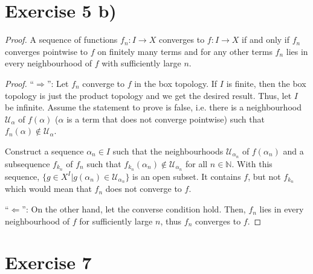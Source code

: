 \documentclass[a4paper]{article}
\theoremstyle{definition}
\begin{document}
\section*{Exercise 5 b)}
    \begin{proof}
        A sequence of functions \(f_n: I \longrightarrow X\) converges to \(f: I \longrightarrow X\) if and only if \(f_n\) converges pointwise to \(f\) on finitely many terms and for any other terms \(f_n\) lies in every neighbourhood of \(f\) with sufficiently large \(n\).
        
        \textit{Proof.} ``\(\Rightarrow\)'': Let \(f_n\) converge to \(f\) in the box topology. If \(I\) is finite, then the box topology is just the product topology and we get the desired result. Thus, let \(I\) be infinite. Assume the statement to prove is false, i.e. there is a neighbourhood \(\mathcal{U}_\alpha\) of \(f(\alpha)\) (\(\alpha\) is a term that does not converge pointwise) such that \(f_n(\alpha) \not\in \mathcal{U}_\alpha\).

        Construct a sequence \(\alpha_n \in I\) such that the neighbourhoods \(\mathcal{U}_{\alpha_n}\) of \(f(\alpha_n)\) and a subsequence \(f_{k_n}\) of \(f_n\) such that \(f_{k_n}(\alpha_n) \not\in \mathcal{U}_{\alpha_n}\) for all \(n \in \mathbb{N}\). With this sequence, \(\{g \in X^I | g(\alpha_n) \in \mathcal{U}_{\alpha_n}\}\) is an open subset. It contains \(f\), but not \(f_{k_n}\) which would mean that \(f_n\) does not converge to \(f\).

        ``\(\Leftarrow\)'': On the other hand, let the converse condition hold. Then, \(f_n\) lies in every neighbourhood of \(f\) for sufficiently large \(n\), thus \(f_n\) converges to \(f\).
    \end{proof}

\section*{Exercise 7}
\end{document}
